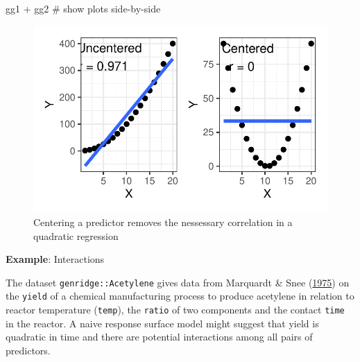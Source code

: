 \documentclass[
  letterpaper,
  10pt,
  krantz2]{krantz}
\makeatletter
\newenvironment{Shaded}{\begin{snugshade}}{\end{snugshade}}
\newcommand{\CommentTok}[1]{\textcolor[rgb]{0.37,0.37,0.37}{#1}}
\newcommand{\NormalTok}[1]{\textcolor[rgb]{0.00,0.23,0.31}{#1}}
\newcommand{\SpecialCharTok}[1]{\textcolor[rgb]{0.37,0.37,0.37}{#1}}
\newenvironment{kframe}{%
  \medskip{}
  \setlength{\fboxsep}{.8em}
  \def\at@end@of@kframe{}%
  \ifinner\ifhmode%
  \def\at@end@of@kframe{\end{minipage}}%
  \begin{minipage}{\columnwidth}%
  \fi\fi%
  \def\FrameCommand##1{\hskip\@totalleftmargin \hskip-\fboxsep
  \colorbox{shadecolor}{##1}\hskip-\fboxsep
      \hskip-\linewidth \hskip-\@totalleftmargin \hskip\columnwidth}%
  \MakeFramed {\advance\hsize-\width
    \@totalleftmargin\z@ \linewidth\hsize
    \@setminipage}}%
{\par\unskip\endMakeFramed%
  \at@end@of@kframe}
\renewenvironment{Shaded}{\begin{kframe}}{\end{kframe}}
\makeatother
\begin{document}
\begin{Shaded}
\begin{Highlighting}[]
\NormalTok{gg1 }\SpecialCharTok{+}\NormalTok{ gg2         }\CommentTok{\# show plots side{-}by{-}side}
\end{Highlighting}
\end{Shaded}

\begin{figure}[H]

{\centering \includegraphics[width=1\textwidth,height=\textheight]{figs/fig-collin-centering-1.pdf}

}

\caption{\label{fig-collin-centering}Centering a predictor removes the
nessessary correlation in a quadratic regression}

\end{figure}

\textbf{Example}: Interactions

The dataset \texttt{genridge::Acetylene} gives data from Marquardt \&
Snee (\protect\hyperlink{ref-MarquardtSnee1975}{1975}) on the
\texttt{yield} of a chemical manufacturing process to produce acetylene
in relation to reactor temperature (\texttt{temp}), the \texttt{ratio}
of two components and the contact \texttt{time} in the reactor. A naive
response surface model might suggest that yield is quadratic in time and
there are potential interactions among all pairs of predictors.
\end{document}

